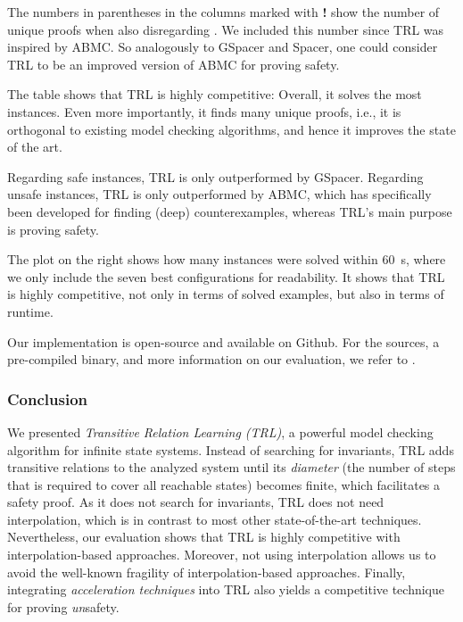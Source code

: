 The numbers in parentheses in the columns marked with {\bf !} show the number of unique proofs when also disregarding .
%
We included this number since TRL was inspired by ABMC.
%
So analogously to GSpacer and Spacer, one could consider TRL to be an improved version of ABMC for proving safety.

The table shows that TRL is highly competitive:
%
Overall, it solves the most instances.
%
Even more importantly, it finds many unique proofs, i.e., it is orthogonal to existing model checking algorithms, and hence it improves the state of the art.

Regarding safe instances, TRL is only outperformed by GSpacer.
%
Regarding unsafe instances, TRL is only outperformed by ABMC, which has specifically been
developed for finding (deep) counterexamples, whereas TRL's main purpose is proving
safety.

The plot on the right shows how many instances were solved within 60~s, where we only include the seven best configurations for readability.
%
It shows that TRL is highly competitive, not only in terms of solved examples, but also in terms of runtime.

Our implementation is open-source and available on Github.
%
For the sources, a pre-compiled binary, and more information on our evaluation, we refer to \cite{website}.

\subsubsection*{Conclusion}

We presented \emph{Transitive Relation Learning (TRL)}, a powerful model checking algorithm for infinite state systems.
%
Instead of searching for invariants, TRL adds transitive relations to the analyzed system until its \emph{diameter} (the number of steps that is required to cover all reachable states) becomes finite, which facilitates a safety proof.
%
As it does not search for invariants, TRL does not need interpolation, which is in contrast to most other state-of-the-art techniques.
%
Nevertheless, our evaluation shows that TRL is highly competitive with interpolation-based approaches.
%
Moreover, not using interpolation allows us to avoid the well-known fragility of interpolation-based approaches.
%
Finally, integrating \emph{acceleration techniques} into TRL also yields a competitive technique for proving \emph{un}safety.

